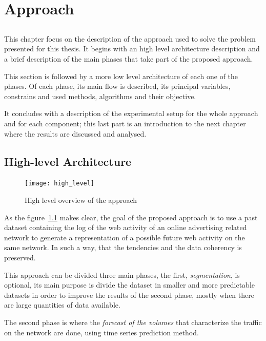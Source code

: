 \chapter{Approach}\label{chap:chap4}

\section*{}
This chapter focus on the description of the approach used to solve the
problem presented for this thesis. It begins with an high level architecture
description and a brief description of the main phases that take part of the
proposed approach.

This section is followed by a more low level architecture of each one of the phases.
Of each phase, its main flow is described, its principal variables, constrains and
used methods, algorithms and their objective.

It concludes with a description of the experimental setup for the whole approach
and for each component; this last part is an introduction to the next
chapter where the results are discussed and analysed.

\section{High-level Architecture}

\begin{figure}[h] \begin{center} \leavevmode
\texttt{[image: high\_level]} \caption{ High level overview
of the approach } \label{fig:highlevel_arch} \end{center} \end{figure}

As the figure~\ref{fig:highlevel_arch} makes clear, the goal of the
proposed approach is to use a past dataset containing the log of the web
activity of an online advertising related network to generate a representation of a
possible future web activity on the same network. In such a way, that the
tendencies and the data coherency is preserved.

This approach can be divided three main phases, the first, \emph{segmentation}, is
optional, its main purpose is divide the dataset in smaller and more predictable
datasets in order to improve the results of the second phase, mostly when there
are large quantities of data available.

The second phase is where the \emph{forecast of the volumes} that characterize the traffic on
the network are done, using time series prediction method.

